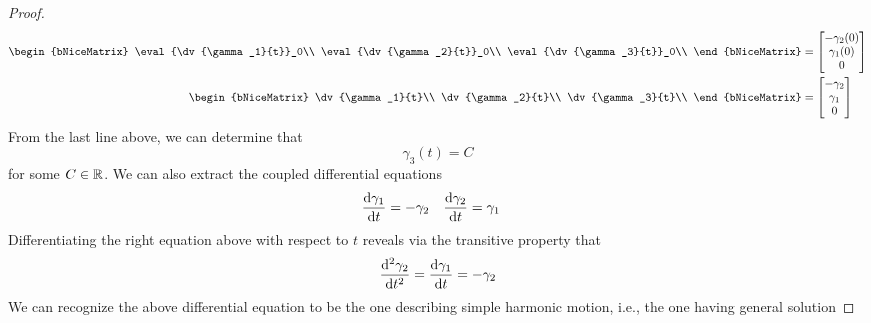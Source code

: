 \documentclass[../psets.tex]{subfiles}
\begin{document}
\begin{enumerate}[label={\textbf{4.3.\roman*.}}]
\begin{enumerate}
\begin{proof}
\begin{align*}
                \begin{bNiceMatrix}
                    \eval{\dv{\gamma_1}{t}}_0\\
                    \eval{\dv{\gamma_2}{t}}_0\\
                    \eval{\dv{\gamma_3}{t}}_0\\
                \end{bNiceMatrix}
                &=
                \begin{bmatrix}
                    -\gamma_2(0)\\
                    \gamma_1(0)\\
                    0\\
                \end{bmatrix}\\
                \begin{bNiceMatrix}
                    \dv{\gamma_1}{t}\\
                    \dv{\gamma_2}{t}\\
                    \dv{\gamma_3}{t}\\
                \end{bNiceMatrix}
                &=
                \begin{bmatrix}
                    -\gamma_2\\
                    \gamma_1\\
                    0\\
                \end{bmatrix}
            \end{align*}
            \endgroup
            From the last line above, we can determine that
            \begin{equation*}
                \gamma_3(t) = C
            \end{equation*}
            for some $C\in\mathbb{R}$. We can also extract the coupled differential equations
            \begin{align*}
                \dv{\gamma_1}{t} &= -\gamma_2&
                \dv{\gamma_2}{t} &= \gamma_1
            \end{align*}
            Differentiating the right equation above with respect to $t$ reveals via the transitive property that
            \begin{equation*}
                \dv[2]{\gamma_2}{t} = \dv{\gamma_1}{t} = -\gamma_2
            \end{equation*}
            We can recognize the above differential equation to be the one describing simple harmonic motion, i.e., the one having general solution

\end{proof}
\end{enumerate}
\end{enumerate}
\end{document}
